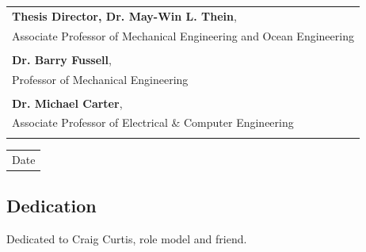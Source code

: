 \documentclass[12pt,a4paper]{book}
\begin{document}
\begin{supertabular}{p{12cm}}
      \hline
         \textbf{Thesis Director, Dr. May-Win L. Thein},\\
         \small{Associate Professor of Mechanical Engineering and Ocean Engineering} \\
         \vspace{5mm} \\
      \hline
         \textbf{Dr. Barry Fussell},\\
         \small{Professor of Mechanical Engineering}
         \\
         \vspace{5mm}\\
      \hline
         \textbf{Dr. Michael Carter},\\
         \small{Associate Professor of Electrical \& Computer Engineering} \\
         \vspace{12mm}\\
    \end{supertabular}

 \hspace*{6cm}   \begin{tabular*}{2in}{l}
      \hline
        Date
    \end{tabular*}




\newpage
\begin{center}
\section*{Dedication}
\vspace{8cm}
Dedicated to Craig Curtis, role model and friend.
\clearpage
\end{center}
\end{document}
